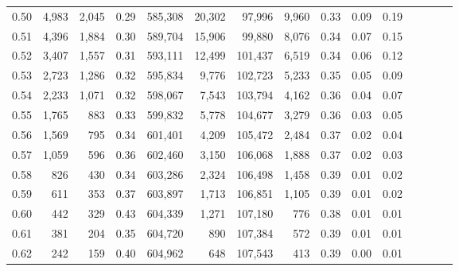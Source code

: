 \begin{tabular}{rrrcrrrrrrrrrrr}
0.50 &   4,983 &  2,045 &                                       0.29 &  585,308 &   20,302 &   97,996 &    9,960 &  0.33 &  0.09 &                         0.19 \\
0.51 &   4,396 &  1,884 &                                       0.30 &  589,704 &   15,906 &   99,880 &    8,076 &  0.34 &  0.07 &                         0.15 \\
0.52 &   3,407 &  1,557 &                                       0.31 &  593,111 &   12,499 &  101,437 &    6,519 &  0.34 &  0.06 &                         0.12 \\
0.53 &   2,723 &  1,286 &                                       0.32 &  595,834 &    9,776 &  102,723 &    5,233 &  0.35 &  0.05 &                         0.09 \\
0.54 &   2,233 &  1,071 &                                       0.32 &  598,067 &    7,543 &  103,794 &    4,162 &  0.36 &  0.04 &                         0.07 \\
0.55 &   1,765 &    883 &                                       0.33 &  599,832 &    5,778 &  104,677 &    3,279 &  0.36 &  0.03 &                         0.05 \\
0.56 &   1,569 &    795 &                                       0.34 &  601,401 &    4,209 &  105,472 &    2,484 &  0.37 &  0.02 &                         0.04 \\
0.57 &   1,059 &    596 &                                       0.36 &  602,460 &    3,150 &  106,068 &    1,888 &  0.37 &  0.02 &                         0.03 \\
0.58 &     826 &    430 &                                       0.34 &  603,286 &    2,324 &  106,498 &    1,458 &  0.39 &  0.01 &                         0.02 \\
0.59 &     611 &    353 &                                       0.37 &  603,897 &    1,713 &  106,851 &    1,105 &  0.39 &  0.01 &                         0.02 \\
0.60 &     442 &    329 &                                       0.43 &  604,339 &    1,271 &  107,180 &      776 &  0.38 &  0.01 &                         0.01 \\
0.61 &     381 &    204 &                                       0.35 &  604,720 &      890 &  107,384 &      572 &  0.39 &  0.01 &                         0.01 \\
0.62 &     242 &    159 &                                       0.40 &  604,962 &      648 &  107,543 &      413 &  0.39 &  0.00 &                         0.01 \\

\end{tabular}
